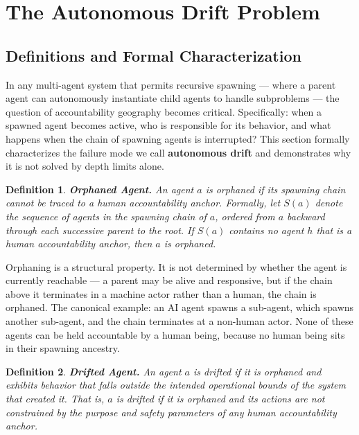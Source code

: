 \documentclass[12pt]{article}
\newtheorem{definition}{Definition}
\begin{document}
\section{The Autonomous Drift Problem}
\label{sec:drift}

\subsection{Definitions and Formal Characterization}

In any multi-agent system that permits recursive spawning — where a parent agent can autonomously instantiate child agents to handle subproblems — the question of accountability geography becomes critical. Specifically: when a spawned agent becomes active, who is responsible for its behavior, and what happens when the chain of spawning agents is interrupted? This section formally characterizes the failure mode we call \textbf{autonomous drift} and demonstrates why it is not solved by depth limits alone.

\begin{definition}
\textbf{Orphaned Agent.} An agent $a$ is \textit{orphaned} if its spawning chain cannot be traced to a human accountability anchor. Formally, let $S(a)$ denote the sequence of agents in the spawning chain of $a$, ordered from $a$ backward through each successive parent to the root. If $S(a)$ contains no agent $h$ that is a human accountability anchor, then $a$ is orphaned.
\end{definition}

Orphaning is a structural property. It is not determined by whether the agent is currently reachable — a parent may be alive and responsive, but if the chain above it terminates in a machine actor rather than a human, the chain is orphaned. The canonical example: an AI agent spawns a sub-agent, which spawns another sub-agent, and the chain terminates at a non-human actor. None of these agents can be held accountable by a human being, because no human being sits in their spawning ancestry.

\begin{definition}
\textbf{Drifted Agent.} An agent $a$ is \textit{drifted} if it is orphaned and exhibits behavior that falls outside the intended operational bounds of the system that created it. That is, $a$ is drifted if it is orphaned and its actions are not constrained by the purpose and safety parameters of any human accountability anchor.
\end{definition}
\end{document}
